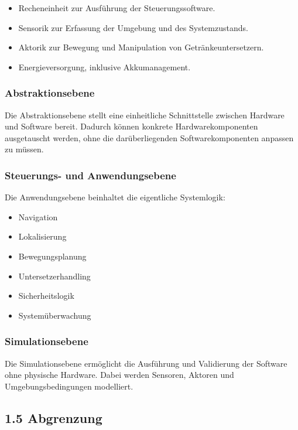 \documentclass[
]{article}
\providecommand{\tightlist}{%
  \setlength{\itemsep}{0pt}\setlength{\parskip}{0pt}}
\begin{document}
\begin{itemize}
\tightlist
\item
  Recheneinheit zur Ausführung der Steuerungssoftware.
\item
  Sensorik zur Erfassung der Umgebung und des Systemzustands.
\item
  Aktorik zur Bewegung und Manipulation von Getränkeuntersetzern.
\item
  Energieversorgung, inklusive Akkumanagement.
\end{itemize}

\subsubsection{Abstraktionsebene}\label{abstraktionsebene}

Die Abstraktionsebene stellt eine einheitliche Schnittstelle zwischen
Hardware und Software bereit. Dadurch können konkrete
Hardwarekomponenten ausgetauscht werden, ohne die darüberliegenden
Softwarekomponenten anpassen zu müssen.

\subsubsection{Steuerungs- und
Anwendungsebene}\label{steuerungs--und-anwendungsebene}

Die Anwendungsebene beinhaltet die eigentliche Systemlogik:

\begin{itemize}
\tightlist
\item
  Navigation
\item
  Lokalisierung
\item
  Bewegungsplanung
\item
  Untersetzerhandling
\item
  Sicherheitslogik
\item
  Systemüberwachung
\end{itemize}

\subsubsection{Simulationsebene}\label{simulationsebene}

Die Simulationsebene ermöglicht die Ausführung und Validierung der
Software ohne physische Hardware. Dabei werden Sensoren, Aktoren und
Umgebungsbedingungen modelliert.

\subsection{1.5 Abgrenzung}\label{abgrenzung}
\end{document}
